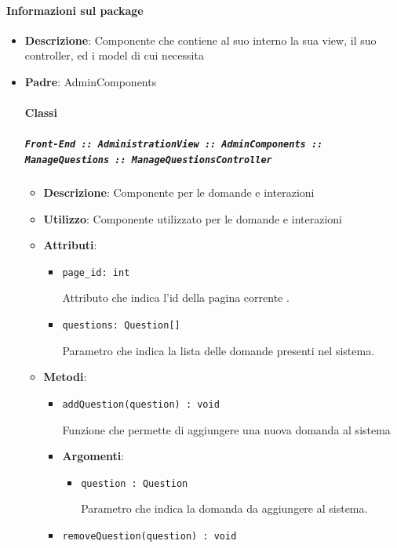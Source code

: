 \documentclass[../DefinizioneDiProdotto.tex]{subfiles}
\begin{document}
	\paragraph{Informazioni sul package}\begin{itemize}\item \textbf{Descrizione}: Componente che contiene al suo interno la sua view, il suo controller, ed i model di cui necessita\item \textbf{Padre}: AdminComponents\paragraph{Classi}
	\subparagraph{\texttt{Front-End :: AdministrationView :: AdminComponents :: ManageQuestions :: ManageQuestionsController}}
	\begin{itemize}\item \textbf{Descrizione}: Componente per le domande e interazioni
	\item \textbf{Utilizzo}: Componente utilizzato per le domande e interazioni
	\item \textbf{Attributi}:
	\begin{itemize}
	\item \texttt{page\_id: int}\

	 Attributo che indica l'id della pagina corrente
	.
	\end{itemize}
	\begin{itemize}
	\item \texttt{questions: Question[]}\

	 Parametro che indica la lista delle domande presenti nel sistema.
	\end{itemize}
	\item \textbf{Metodi}:
	\begin{itemize}
	\item \texttt{addQuestion(question) : void}\

	 Funzione che permette di aggiungere una nuova domanda al sistema

	\item \textbf{Argomenti}:
	\begin{itemize}
	\item \texttt{question : Question}\

	 Parametro che indica la domanda da aggiungere al sistema.
	\end{itemize}
	\end{itemize}\vspace{0.5em}
	\begin{itemize}
	\item \texttt{removeQuestion(question) : void}\


\end{itemize}
\end{itemize}
\end{itemize}
\end{document}
